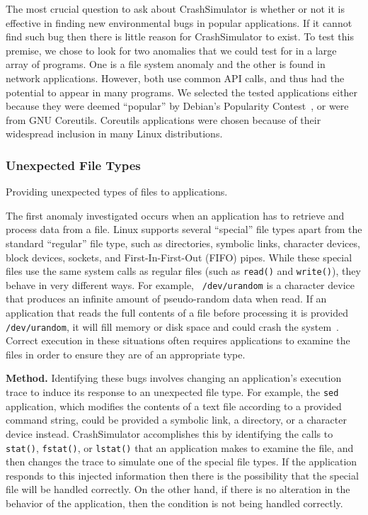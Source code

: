 The most crucial question to ask about CrashSimulator is whether or not it is
effective in finding new environmental bugs in popular applications.
If it cannot
find such bug then there is little reason for CrashSimulator to exist.
To test this premise,
we chose to look for two anomalies that we could test for in a large
array of programs.  One is a file system anomaly and the other is found in
network applications.
However, both use common API calls, and thus had the potential to
appear in many programs.  We selected the tested applications either
because they were deemed
``popular'' by Debian's Popularity Contest~\cite{DebPopCon}, or were from
GNU Coreutils.  Coreutils applications were chosen because of their
widespread inclusion in many Linux distributions.

\subsubsection{Unexpected File Types}
\label{sec-file-type-bugs}
Providing unexpected types of files to
applications.

The first anomaly investigated occurs when an application has to retrieve
and process data from a file.  Linux supports several ``special'' file
types apart from the standard ``regular'' file type, such as
directories, symbolic links, character devices, block devices, sockets, and
First-In-First-Out (FIFO) pipes.  While these special files
use the same system calls as regular files (such as {\tt read()} and
{\tt write()}), they behave in very different ways.  For example, {\tt
/dev/urandom} is a character device that produces an infinite amount of
pseudo-random data when read.  If an application that reads the full
contents of a file before processing it is provided {\tt /dev/urandom}, it
will fill memory or disk space and could
crash the system~\cite{YumAptEndless}.
Correct execution in these situations often requires applications
to examine the files in order to ensure they are of an appropriate type.

{\bf Method.}  Identifying these bugs involves changing an application's
execution trace to induce its response to an unexpected file type.  For
example, the {\tt sed} application, which modifies the contents of a text
file according to a provided command string, could be provided a symbolic
link, a directory, or a character device instead.  CrashSimulator
accomplishes this by identifying the calls to {\tt stat()}, {\tt fstat()},
or {\tt lstat()} that an application makes to examine the file, and then
changes the trace to simulate
one of the special file types.  If the application responds to
this injected information then there is the possibility that the special
file will be handled correctly.  On the other hand, if there is no
alteration in the behavior of the application,  then the condition is not
being handled correctly.

